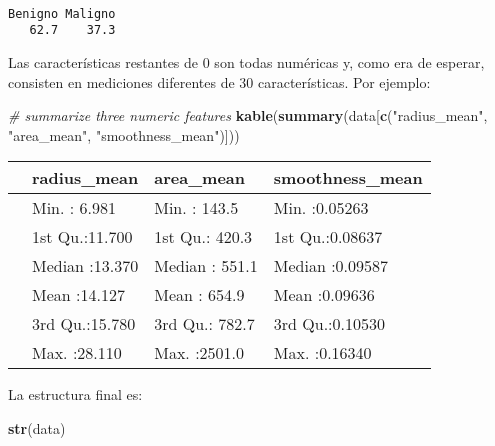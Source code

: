 \documentclass[
]{article}
\newenvironment{Shaded}{\begin{snugshade}}{\end{snugshade}}
\newcommand{\CommentTok}[1]{\textcolor[rgb]{0.56,0.35,0.01}{\textit{#1}}}
\newcommand{\KeywordTok}[1]{\textcolor[rgb]{0.13,0.29,0.53}{\textbf{#1}}}
\newcommand{\NormalTok}[1]{#1}
\newcommand{\StringTok}[1]{\textcolor[rgb]{0.31,0.60,0.02}{#1}}
\begin{document}
\begin{verbatim}

Benigno Maligno 
   62.7    37.3 
\end{verbatim}

Las características restantes de 0 son todas numéricas y, como era de
esperar, consisten en mediciones diferentes de 30 características. Por
ejemplo:

\begin{Shaded}
\begin{Highlighting}[]
\CommentTok{# summarize three numeric features}
\KeywordTok{kable}\NormalTok{(}\KeywordTok{summary}\NormalTok{(data[}\KeywordTok{c}\NormalTok{(}\StringTok{"radius_mean"}\NormalTok{, }\StringTok{"area_mean"}\NormalTok{, }\StringTok{"smoothness_mean"}\NormalTok{)]))}
\end{Highlighting}
\end{Shaded}

\begin{tabular}{l|l|l|l}
\hline
  &  radius\_mean &   area\_mean & smoothness\_mean\\
\hline
 & Min.   : 6.981 & Min.   : 143.5 & Min.   :0.05263\\
\hline
 & 1st Qu.:11.700 & 1st Qu.: 420.3 & 1st Qu.:0.08637\\
\hline
 & Median :13.370 & Median : 551.1 & Median :0.09587\\
\hline
 & Mean   :14.127 & Mean   : 654.9 & Mean   :0.09636\\
\hline
 & 3rd Qu.:15.780 & 3rd Qu.: 782.7 & 3rd Qu.:0.10530\\
\hline
 & Max.   :28.110 & Max.   :2501.0 & Max.   :0.16340\\
\hline
\end{tabular}

La estructura final es:

\begin{Shaded}
\begin{Highlighting}[]
\KeywordTok{str}\NormalTok{(data)}
\end{Highlighting}
\end{Shaded}
\end{document}

